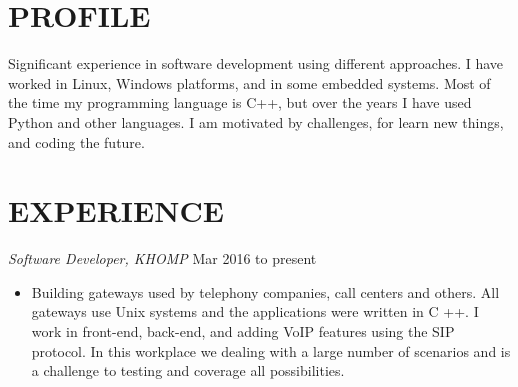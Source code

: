 \documentclass[line,margin]{res}
\begin{document}
\address{alvarofleith@gmail.com or +64 (09) 889-3534}
\address{https://linkedin.com/in/alvarofleith}

 
\begin{resume}
 
\section{PROFILE}       Significant experience in software development using different approaches. I have worked in Linux, Windows platforms, and in some embedded systems. Most of the time my programming language is C++, but over the years I have used Python and other languages. I am motivated by challenges, for learn new things, and coding the future.
 
 
 \section{EXPERIENCE} {\sl Software Developer, KHOMP} \hfill Mar 2016 to present \\
                 \begin{itemize}  \itemsep -2pt
                 \item Building gateways used by telephony companies, call centers and others. All gateways use Unix systems and the applications were written in C ++. I work in front-end, back-end, and adding VoIP features using the SIP protocol. In this workplace we dealing with a large number of scenarios and is a challenge to testing and coverage all possibilities.
                \end{itemize}
 

\end{resume}
\end{document}
